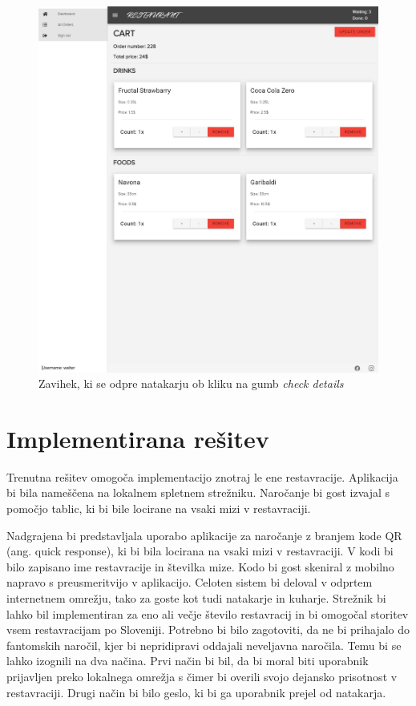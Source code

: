 \documentclass[a4paper, 12pt]{book}
\begin{document}
\begin{figure}[!htb]
\begin{center}
\includegraphics[width=12cm]{natakar_22.jpg}
\caption{Zavihek, ki se odpre natakarju ob kliku na gumb \textit{check details}}
\label{Natakar_3}
\end{center} 
\end{figure}




\section{Implementirana rešitev}

Trenutna rešitev omogoča implementacijo znotraj le ene restavracije. Aplikacija bi bila nameščena na lokalnem spletnem strežniku. Naročanje bi gost izvajal s pomočjo tablic, ki bi bile locirane na vsaki mizi v restavraciji. 

Nadgrajena bi predstavljala uporabo aplikacije za naročanje z branjem kode QR (ang. quick response), ki bi bila locirana na vsaki mizi v restavraciji. V kodi bi bilo zapisano ime restavracije in številka mize. Kodo bi gost skeniral z mobilno napravo s preusmeritvijo v aplikacijo. Celoten sistem bi deloval v odprtem internetnem omrežju, tako za goste kot tudi natakarje in kuharje. Strežnik bi lahko bil implementiran za eno ali večje število restavracij in bi omogočal storitev vsem restavracijam po Sloveniji. Potrebno bi bilo zagotoviti, da ne bi prihajalo do fantomskih naročil, kjer bi nepridipravi oddajali neveljavna naročila. Temu bi se lahko izognili na dva načina. Prvi način bi bil, da bi moral biti uporabnik prijavljen preko lokalnega omrežja s čimer bi overili svojo dejansko prisotnost v restavraciji.
Drugi način bi bilo geslo, ki bi ga uporabnik prejel od natakarja. 
\end{document}

